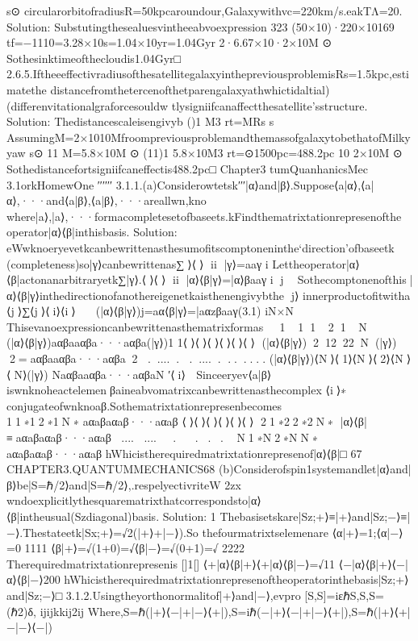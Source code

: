 {{s⊙
circularorbitofradiusR=50kpcaroundour,Galaxywithvc=220km/s.eakTΛ=20.
Solution:
Substutingthesealuesvintheeabvoexpression
323
(50×10)·220×10169
tf=−1110=3.28×10s=1.04×10yr=1.04Gyr
2·6.67×10·2×10M
⊙
Sothesinktimeofthecloudis1.04Gyr□
2.6.5.IftheeeffectivradiusofthesatellitegalaxyinthepreviousproblemisRs=1.5kpc,estimatethe
distancefromthetercenofthetparengalaxyathwhictidaltial)(differenvitationalgraforcesouldw
tlysigniifcanaffectthesatellite’sstructure.
Solution:
Thedistancescaleisengivyb
()1
M3
rt=MRs
s
AssumingM=2×1010MfroompreviousproblemandthemassofgalaxytobethatofMilkyyaw
s⊙
11
M=5.8×10M
⊙
(11)1
5.8×10M3
rt=⊙1500pc=488.2pc
10
2×10M
⊙
Sothedistancefortsigniifcaneffectis488.2pc□
Chapter3
tumQuanhanicsMec
3.1orkHomewOne
′′′′′′
3.1.1.(a)Considerowtetsk′′′|α⟩and|β⟩.Suppose⟨a|α⟩,⟨a|α⟩,···and⟨a|β⟩,⟨a|β⟩,···areallwn,kno
where|a⟩,|a⟩,···formacompletesetofbaseets.kFindthematrixtationrepresenofthe
operator|α⟩⟨β|inthisbasis.
Solution:
eWwknoeryevetkcanbewrittenasthesumofitscomptoneninthe‘direction’ofbaseetk
(completeness)so|γ⟩canbewrittenas∑⟩⟨⟩
ii
|γ⟩=aaγ
i
Lettheoperator|α⟩⟨β|actonanarbitraryetk∑|γ⟩.⟨⟩⟨⟩
ii
|α⟩⟨β|γ⟩=|α⟩βaaγ
i
j⟩

Sothecomptonenofthis|α⟩⟨β|γ⟩inthedirectionofanothereigenetkaisthenengivybthe
j⟩
innerproductofitwitha
⟨j⟩∑⟨j⟩⟨i⟩⟨i⟩

(|α⟩⟨β|γ⟩)j=aα⟨β|γ⟩=|aα{zβa}aγ(3.1)
iN×N
Thisevanoexpressioncanbewrittenasthematrixformas
⟨1⟩⟨1⟩⟨1⟩⟨2⟩⟨1⟩⟨N⟩

(|α⟩⟨β|γ⟩)aαβaaαβa···aαβa(|γ⟩)1
1⟨⟩⟨⟩⟨⟩⟨⟩⟨⟩⟨⟩
(|α⟩⟨β|γ⟩)21222N(|γ⟩)
2=aαβaaαβa···aαβa2
......
......
......
(|α⟩⟨β|γ⟩)⟨N⟩⟨1⟩⟨N⟩⟨2⟩⟨N⟩⟨N⟩(|γ⟩)
Naαβaaαβa···aαβaN
′⟨i⟩

Sinceeryev⟨a|β⟩iswnknoheactelemenβaineabvomatrixcanbewrittenasthecomplex
⟨i⟩∗
conjugateofwnknoaβ.Sothematrixtationrepresenbecomes
⟨⟩⟨⟩⟨⟩⟨⟩⟨⟩⟨⟩
11∗12∗1N∗
aαaβaαaβ···aαaβ
⟨⟩⟨⟩⟨⟩⟨⟩⟨⟩⟨⟩
21∗22∗2N∗
|α⟩⟨β|≡aαaβaαaβ···aαaβ
....
....
⟨⟩.⟨⟩⟨⟩.⟨⟩.⟨⟩.⟨⟩
N1∗N2∗NN∗
aαaβaαaβ···aαaβ
hWhicistherequiredmatrixtationrepresenof|α⟩⟨β|□
67
CHAPTER3.QUANTUMMECHANICS68
(b)Considerofspin1systemandlet|α⟩and|β⟩be|S=ℏ/2⟩and|S=ℏ/2⟩,.respelyectivriteW
2zx
wndoexplicitlythesquarematrixthatcorrespondsto|α⟩⟨β|intheusual(Szdiagonal)basis.
Solution:
1
Thebasisetskare|Sz;+⟩≡|+⟩and|Sz;−⟩≡|−⟩.Thestateetk|Sx;+⟩=√2(|+⟩+|−⟩).So
thefourmatrixtselemenare
⟨α|+⟩=1;⟨α|−⟩=0
1111
⟨β|+⟩=√(1+0)=√⟨β|−⟩=√(0+1)=√
2222
Therequiredmatrixtationrepresenis
[]1[]
⟨+|α⟩⟨β|+⟩⟨+|α⟩⟨β|−⟩=√11
⟨−|α⟩⟨β|+⟩⟨−|α⟩⟨β|−⟩200
hWhicistherequiredmatrixtationrepresenoftheoperatorinthebasis|Sz;+⟩and|Sz;−⟩□
3.1.2.Usingtheyorthonormalitof|+⟩and|−⟩,evpro
[S,S]=iεℏS,{S,S}=(ℏ2)δ,
ijijkkij2ij
Where,S=ℏ(|+⟩⟨−|+|−⟩⟨+|),S=iℏ(−|+⟩⟨−|+|−⟩⟨+|),S=ℏ(|+⟩⟨+|−|−⟩⟨−|)
}}
